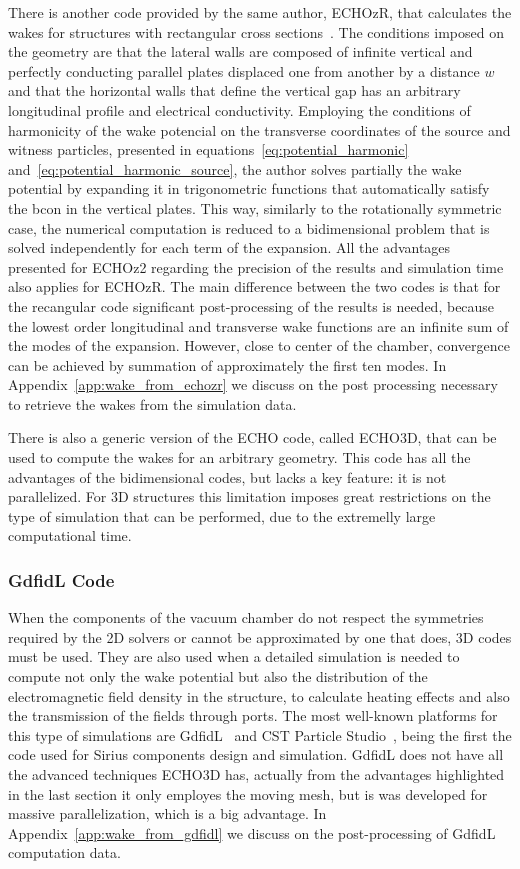     There is another code provided by the same author, ECHOzR, that calculates the wakes for structures with rectangular cross sections~\cite{Zagorodnov2015}. The conditions imposed on the geometry are that the lateral walls are composed of infinite vertical and perfectly conducting parallel plates displaced one from another by a distance $w$ and that the horizontal walls that define the vertical gap has an arbitrary longitudinal profile and electrical conductivity. Employing the conditions of harmonicity of the wake potencial on the transverse coordinates of the source and witness particles, presented in equations~\eqref{eq:potential_harmonic} and~\eqref{eq:potential_harmonic_source}, the author solves partially the wake potential by expanding it in trigonometric functions that automatically satisfy the \gls{bcon} in the vertical plates. This way, similarly to the rotationally symmetric case, the numerical computation is reduced to a bidimensional problem that is solved independently for each term of the expansion. All the advantages presented for ECHOz2 regarding the precision of the results and simulation time also applies for ECHOzR. The main difference between the two codes is that for the recangular code significant post-processing of the results is needed, because the lowest order longitudinal and transverse wake functions are an infinite sum of the modes of the expansion. However, close to center of the chamber, convergence can be achieved by summation of approximately the first ten modes. In Appendix~\ref{app:wake_from_echozr} we discuss on the post processing necessary to retrieve the wakes from the simulation data.

    There is also a generic version of the ECHO code, called ECHO3D, that can be used to compute the wakes for an arbitrary geometry. This code has all the advantages of the bidimensional codes, but lacks a key feature: it is not parallelized. For 3D structures this limitation imposes great restrictions on the type of simulation that can be performed, due to the extremelly large computational time.

\subsubsection{GdfidL Code}

    When the components of the vacuum chamber do not respect the symmetries required by the 2D solvers or cannot be approximated by one that does, 3D codes must be used. They are also used when a detailed simulation is needed to compute not only the wake potential but also the distribution of the electromagnetic field density in the structure, to calculate heating effects and also the transmission of the fields through ports. The most well-known platforms for this type of simulations are GdfidL~\cite{Brums1997} and CST Particle Studio~\cite{siteCST}, being the first the code used for Sirius components design and simulation. GdfidL does not have all the advanced techniques ECHO3D has, actually from the advantages highlighted in the last section it only employes the moving mesh, but is was developed for massive parallelization, which is a big advantage. In Appendix~\ref{app:wake_from_gdfidl} we discuss on the post-processing of GdfidL computation data.


